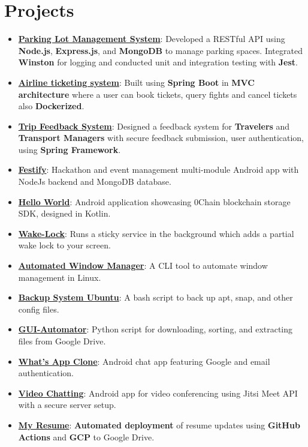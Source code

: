 \documentclass[letterpaper,1pt]{article}
\begin{document}
\section{Projects}
\begin{itemize}[leftmargin=*, itemsep=1pt, parsep=0pt]
      \selectfont\small
      \setlength\itemsep{0em}
      \setlength\parsep{0em}
      \item \href{https://github.com/yash10019coder/ParkingLotBackend}{\textbf{Parking Lot Management System}}: Developed a RESTful API using \textbf{Node.js}, \textbf{Express.js}, and \textbf{MongoDB} to manage parking spaces. Integrated \textbf{Winston} for logging and conducted unit and integration testing with \textbf{Jest}.
      \item \href{https://github.com/yash10019coder/airline-ticketing-system}{\textbf{Airline ticketing system}}: Built using \textbf{Spring Boot} in \textbf{MVC architecture} where a user can book tickets, query fights and cancel tickets also \textbf{Dockerized}.
      \item \href{https://github.com/yash10019coder/TravelSpringBoot}{\textbf{Trip Feedback System}}: Designed a feedback system for \textbf{Travelers} and \textbf{Transport Managers} with secure feedback submission, user authentication, using \textbf{Spring Framework}.
      \item \href{https://github.com/yash10019coder/festify-android}{\textbf{Festify}}: Hackathon and event management multi-module Android app with NodeJs backend and MongoDB database.
      \item \href{https://github.com/0chain/HelloWorld-Android}{\textbf{Hello World}}: Android application showcasing 0Chain blockchain storage SDK, designed in Kotlin.
      \item \href{https://github.com/yash10019coder/Wake-Lock}{\textbf{Wake-Lock}}: Runs a sticky service in the background which adds a partial wake lock to your screen.
      \item \href{https://github.com/yash10019coder/AutomatedWindowManager}{\textbf{Automated Window Manager}}: A CLI tool to automate window management in Linux.
      \item \href{https://github.com/yash10019coder/backup-system-ubuntu}{\textbf{Backup System Ubuntu}}: A bash script to back up apt, snap, and other config files.
      \item \href{https://github.com/yash10019coder/Gui-Automator}{\textbf{GUI-Automator}}: Python script for downloading, sorting, and extracting files from Google Drive.
      \item \href{https://github.com/yash10019coder/Whats-App}{\textbf{What's App Clone}}: Android chat app featuring Google and email authentication.
      \item \href{https://github.com/yash10019coder/Video-Chatting}{\textbf{Video Chatting}}: Android app for video conferencing using Jitsi Meet API with a secure server setup.
      \item \href{https://github.com/yash10019coder/resume}{\textbf{My Resume}}: \textbf{Automated deployment} of resume updates using \textbf{GitHub Actions} and \textbf{GCP} to Google Drive.

\end{itemize}
\end{document}
